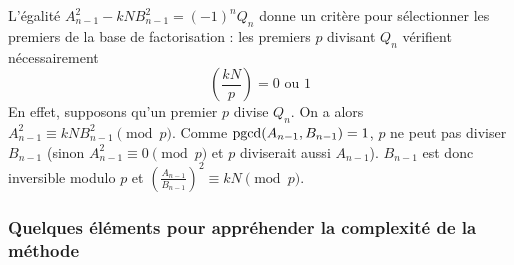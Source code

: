 L'égalité $A_{n-1}^2 - kNB_{n-1}^2 = (-1)^n Q_n$ donne un critère pour
sélectionner les premiers de la base de factorisation : les premiers $p$
divisant $Q_n$ vérifient nécessairement \[ \left(\frac{kN}{p} \right) = 0 
\text{ ou } 1 \] En effet, supposons qu'un premier $p$ divise $Q_n$. 
On a alors $ A_{n-1}^2 \equiv kNB_{n-1}^2 \pmod{p}$. Comme
$\operatorname{pgcd}(A_{n-1},B_{n-1}) = 1$, $p$ ne peut pas diviser $B_{n-1}$ (sinon
$A_{n-1}^2 \equiv 0 \pmod{p}$ et $p$ diviserait aussi $A_{n-1}$). $B_{n-1}$ 
est donc inversible modulo $p$ et $\left( \frac{A_{n-1}}{B_{n-1}}\right )^2 
\equiv kN \pmod{p}$.\\ 

\subsubsection{Quelques éléments pour appréhender la complexité de la méthode}

